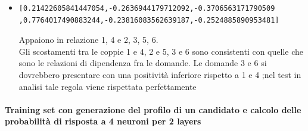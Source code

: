 \documentclass[11pt,a4paper,italian]{article}
\begin{document}
\begin{itemize}
\item \begin{verbatim}[0.21422605841447054,-0.2636944179712092,-0.3706563171790509
,0.7764017490883244,-0.23816083562639187,-0.2524885890953481]\end{verbatim}
Appaiono in relazione 1, 4 e 2, 3, 5, 6.\\
Gli scostamenti tra le coppie  1 e 4, 2 e 5, 3 e 6 sono consistenti con quelle che sono le relazioni di dipendenza fra le domande.
Le domande 3 e 6 si dovrebbero presentare con una positivit\`a inferiore rispetto a 1 e 4 ;nel test in analisi tale regola viene rispettata perfettamente
\end{itemize}


\paragraph{Training set con generazione del profilo di un candidato e calcolo delle probabilit\`a di risposta a 4 neuroni per 2 layers}\mbox{}
\label{Training set con generazione del profilo di un candidato e calcolo delle probabilita di risposta a 4 neuroni}
\\
\noindent
\end{document}
